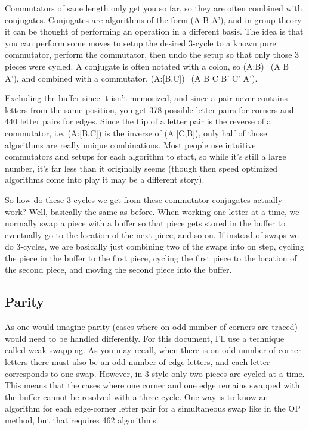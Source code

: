 \documentclass{article}
\begin{document}
Commutators of sane length only get you so far, so they are often combined with conjugates. Conjugates are algorithms of the form (A B A'), and in group theory it can be thought of performing an operation in a different basis. The idea is that you can perform some moves to setup the desired 3-cycle to a known pure commutator, perform the commutator, then undo the setup so that only those 3 pieces were cycled. A conjugate is often notated with a colon, so (A:B)=(A B A'), and combined with a commutator, (A:[B,C])=(A B C B' C' A').

Excluding the buffer since it isn't memorized, and since a pair never contains letters from the same position, you get 378 possible letter pairs for corners and 440 letter pairs for edges. Since the flip of a letter pair is the reverse of a commutator, i.e. (A:[B,C]) is the inverse of (A:[C,B]), only half of those algorithms are really unique combinations. Most people use intuitive commutators and setups for each algorithm to start, so while it's still a large number, it's far less than it originally seems (though then speed optimized algorithms come into play it may be a different story).

So how do these 3-cycles we get from these commutator conjugates actually work? Well, basically the same as before. When working one letter at a time, we normally swap a piece with a buffer so that piece gets stored in the buffer to eventually go to the location of the next piece, and so on. If instead of swaps we do 3-cycles, we are basically just combining two of the swaps into on step, cycling the piece in the buffer to the first piece, cycling the first piece to the location of the second piece, and moving the second piece into the buffer.

\subsection{Parity}

As one would imagine parity (cases where on odd number of corners are traced) would need to be handled differently. For this document, I'll use a technique called weak swapping. As you may recall, when there is on odd number of corner letters there must also be an odd number of edge letters, and each letter corresponds to one swap. However, in 3-style only two pieces are cycled at a time. This means that the cases where one corner and one edge remains swapped with the buffer cannot be resolved with a three cycle. One way is to know an algorithm for each edge-corner letter pair for a simultaneous swap like in the OP method, but that requires 462 algorithms.
\end{document}
